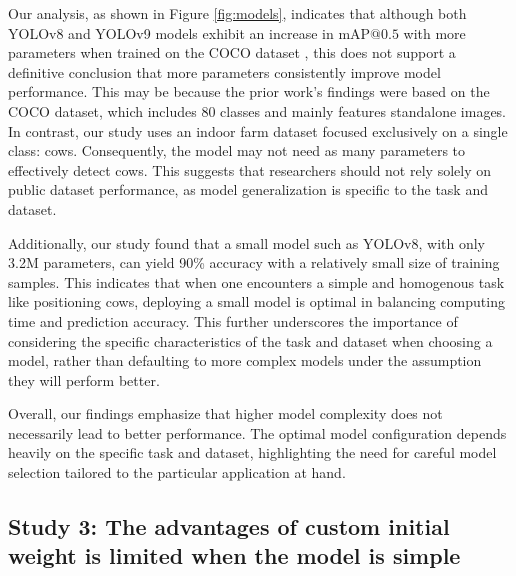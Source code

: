 Our analysis, as shown in Figure \ref{fig:models}, indicates that although both YOLOv8 \cite{ultralyticsYOLOv8} and YOLOv9 \cite{wang2024yolov9} models exhibit an increase in $\text{mAP@{0.5}}$ with more parameters when trained on the COCO dataset \cite{lin2014microsoft}, this does not support a definitive conclusion that more parameters consistently improve model performance. This may be because the prior work's findings were based on the COCO dataset, which includes 80 classes and mainly features standalone images. In contrast, our study uses an indoor farm dataset focused exclusively on a single class: cows. Consequently, the model may not need as many parameters to effectively detect cows. This suggests that researchers should not rely solely on public dataset performance, as model generalization is specific to the task and dataset.

Additionally, our study found that a small model such as YOLOv8, with only 3.2M parameters, can yield 90\% accuracy with a relatively small size of training samples. This indicates that when one encounters a simple and homogenous task like positioning cows, deploying a small model is optimal in balancing computing time and prediction accuracy. This further underscores the importance of considering the specific characteristics of the task and dataset when choosing a model, rather than defaulting to more complex models under the assumption they will perform better.

Overall, our findings emphasize that higher model complexity does not necessarily lead to better performance. The optimal model configuration depends heavily on the specific task and dataset, highlighting the need for careful model selection tailored to the particular application at hand.



\subsection*{Study 3: The advantages of custom initial weight  is limited when the model is simple}


